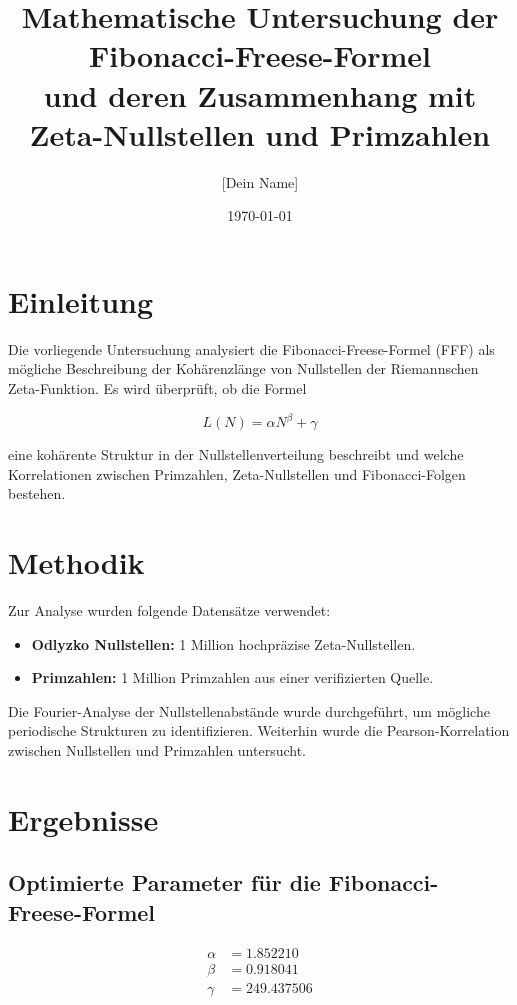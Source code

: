 \documentclass[a4paper,12pt]{article}
\title{Mathematische Untersuchung der Fibonacci-Freese-Formel \\ 
und deren Zusammenhang mit Zeta-Nullstellen und Primzahlen}
\author{[Dein Name]}
\date{\today}
\begin{document}
\maketitle

\section{Einleitung}
Die vorliegende Untersuchung analysiert die Fibonacci-Freese-Formel (FFF) als mögliche Beschreibung der Kohärenzlänge von Nullstellen der Riemannschen Zeta-Funktion. Es wird überprüft, ob die Formel 

\begin{equation}
    L(N) = \alpha N^\beta + \gamma
\end{equation}

eine kohärente Struktur in der Nullstellenverteilung beschreibt und welche Korrelationen zwischen Primzahlen, Zeta-Nullstellen und Fibonacci-Folgen bestehen.

\section{Methodik}
Zur Analyse wurden folgende Datensätze verwendet:
\begin{itemize}
    \item \textbf{Odlyzko Nullstellen:} 1 Million hochpräzise Zeta-Nullstellen.
    \item \textbf{Primzahlen:} 1 Million Primzahlen aus einer verifizierten Quelle.
\end{itemize}

Die Fourier-Analyse der Nullstellenabstände wurde durchgeführt, um mögliche periodische Strukturen zu identifizieren. Weiterhin wurde die Pearson-Korrelation zwischen Nullstellen und Primzahlen untersucht.

\section{Ergebnisse}
\subsection{Optimierte Parameter für die Fibonacci-Freese-Formel}
\begin{align}
    \alpha &= 1.852210 \\
    \beta  &= 0.918041 \\
    \gamma &= 249.437506
\end{align}
\end{document}
